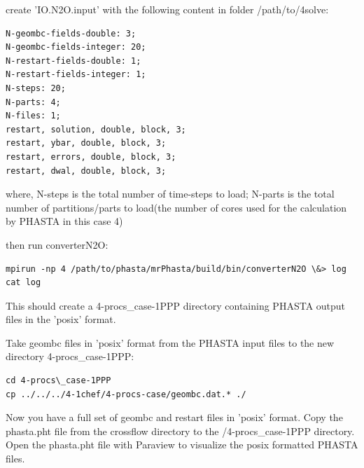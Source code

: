 \documentclass{article}
\begin{document}
create 'IO.N2O.input' with the following content in folder /path/to/4solve:
\begin{lstlisting}
N-geombc-fields-double: 3;
N-geombc-fields-integer: 20;
N-restart-fields-double: 1;
N-restart-fields-integer: 1;
N-steps: 20;
N-parts: 4;
N-files: 1;
restart, solution, double, block, 3;
restart, ybar, double, block, 3;
restart, errors, double, block, 3;
restart, dwal, double, block, 3;
\end{lstlisting}

where, N-steps is the total number of time-steps to load; N-parts is the total number of partitions/parts to load(the number of cores used for the calculation by PHASTA in this case 4)

then run converterN2O:
\begin{lstlisting}
mpirun -np 4 /path/to/phasta/mrPhasta/build/bin/converterN2O \&> log
cat log
\end{lstlisting}

This should create a 4-procs\_case-1PPP directory containing PHASTA output files in the 'posix' format.

Take geombc files in 'posix' format from the PHASTA input files to the new directory 4-procs\_case-1PPP:

\begin{lstlisting}
cd 4-procs\_case-1PPP
cp ../../../4-1chef/4-procs-case/geombc.dat.* ./
\end{lstlisting}

Now you have a full set of geombc and restart files in 'posix' format. Copy the phasta.pht file from the crossflow directory to the /4-procs\_case-1PPP directory. Open the phasta.pht file with Paraview to visualize the posix formatted PHASTA files.
\end{document}
